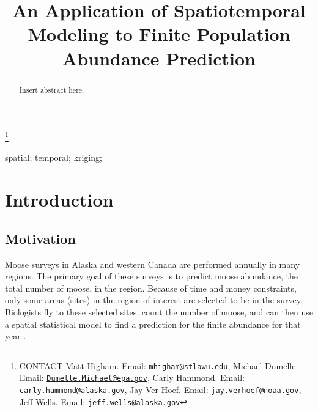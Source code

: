 \documentclass[]{interact}
\theoremstyle{plain}%
\theoremstyle{definition}
\theoremstyle{remark}
\begin{document}

\title{An Application of Spatiotemporal Modeling to Finite Population
Abundance Prediction}


\author{
}

\thanks{CONTACT Matt
Higham. Email: \href{mailto:mhigham@stlawu.edu}{\nolinkurl{mhigham@stlawu.edu}}, Michael
Dumelle. Email: \href{mailto:Dumelle.Michael@epa.gov}{\nolinkurl{Dumelle.Michael@epa.gov}}, Carly
Hammond. Email: \href{mailto:carly.hammond@alaska.gov}{\nolinkurl{carly.hammond@alaska.gov}}, Jay
Ver
Hoef. Email: \href{mailto:jay.verhoef@noaa.gov}{\nolinkurl{jay.verhoef@noaa.gov}}, Jeff
Wells. Email: \href{mailto:jeff.wells@alaska.gov}{\nolinkurl{jeff.wells@alaska.gov}}}

\maketitle

\begin{abstract}
Insert abstract here.
\end{abstract}

\begin{keywords}
spatial; temporal; kriging;
\end{keywords}

\section{Introduction}

\subsection{Motivation}

Moose surveys in Alaska and western Canada are performed annually in
many regions. The primary goal of these surveys is to predict moose
abundance, the total number of moose, in the region. Because of time and
money constraints, only some areas (sites) in the region of interest are
selected to be in the survey. Biologists fly to these selected sites,
count the number of moose, and can then use a spatial statistical model
to find a prediction for the finite abundance for that year
\citep{ver2008spatial}.
\end{document}
